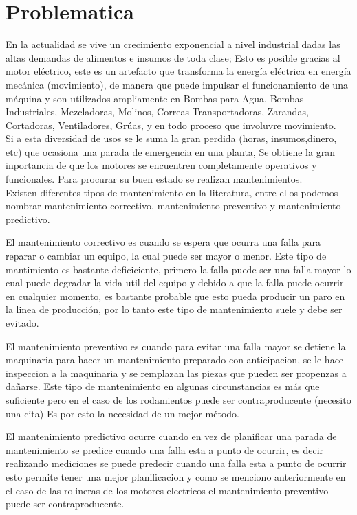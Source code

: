 \setcounter{page}{1}
\section{Problematica}

En la actualidad se vive un crecimiento exponencial a nivel industrial dadas las altas demandas de alimentos e insumos de toda clase; Esto es posible gracias al motor eléctrico, este es un artefacto que transforma la energía eléctrica en energía mecánica (movimiento), de manera que puede impulsar el funcionamiento de una máquina y son utilizados ampliamente en Bombas para Agua, Bombas Industriales, Mezcladoras, Molinos, Correas Transportadoras, Zarandas, Cortadoras, Ventiladores, Grúas, y en todo proceso que involuvre movimiento.\\
Si a esta diversidad de usos se le suma la gran perdida (horas, insumos,dinero, etc) que ocasiona una parada de emergencia en una planta, Se obtiene la gran inportancia de que los motores se encuentren completamente operativos y funcionales. Para procurar su buen estado se realizan mantenimientos.\\



Existen diferentes tipos de mantenimiento en la literatura, entre ellos podemos
nombrar mantenimiento correctivo, mantenimiento preventivo y mantenimiento
predictivo.  

El mantenimiento correctivo es cuando se espera que ocurra una falla para
reparar o cambiar un equipo, la cual puede ser mayor o menor. Este tipo de
mantimiento es bastante deficiciente, primero la falla puede ser una falla
mayor lo cual puede degradar la vida util del equipo y debido a que la falla
puede ocurrir en cualquier momento, es bastante probable que esto pueda
producir un paro en la linea de producción, por lo tanto este tipo de
mantenimiento suele y debe ser evitado.

El mantenimiento preventivo es cuando para evitar una falla mayor se detiene la
maquinaria para hacer un mantenimiento preparado con anticipacion, se le hace
inspeccion a la maquinaria y se remplazan las piezas que pueden ser propenzas a
dañarse. Este tipo de mantenimiento en algunas circunstancias es más que
suficiente pero en el caso de los rodamientos puede ser contraproducente
(necesito una cita) Es por esto la necesidad de un mejor método.

El mantenimiento predictivo ocurre cuando en vez de planificar una parada de
mantenimiento se predice cuando una falla esta a punto de ocurrir, es decir
realizando mediciones se puede predecir cuando una falla esta a punto de
ocurrir esto permite tener una mejor planificacion y como se menciono
anteriormente en el caso de las rolineras de los motores electricos el
mantenimiento preventivo puede ser contraproducente.


